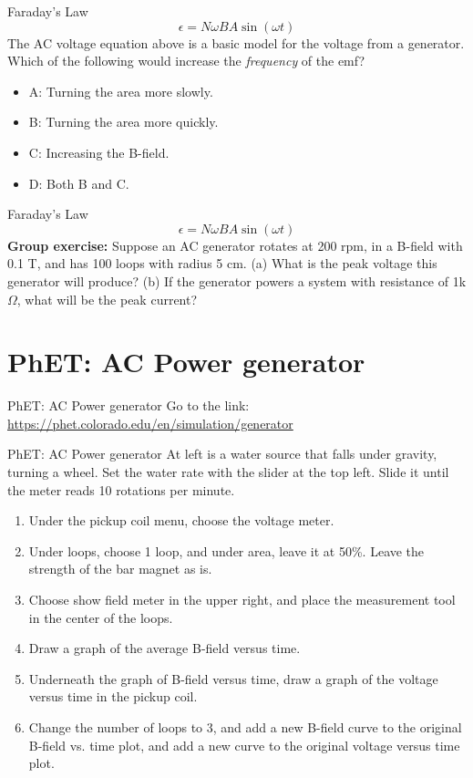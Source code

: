 \documentclass{beamer}
\begin{document}
\begin{frame}{Faraday's Law}
\begin{equation}
\epsilon = N\omega BA \sin(\omega t)
\end{equation}
The AC voltage equation above is a basic model for the voltage from a generator.  Which of the following would increase the \textit{frequency} of the emf?
\begin{itemize}
\item A: Turning the area more slowly.
\item B: Turning the area more quickly.
\item C: Increasing the B-field.
\item D: Both B and C.
\end{itemize}
\end{frame}

\begin{frame}{Faraday's Law}
\begin{equation}
\epsilon = N\omega BA \sin(\omega t)
\end{equation}
\textbf{Group exercise:} Suppose an AC generator rotates at 200 rpm, in a B-field with 0.1 T, and has 100 loops with radius 5 cm.  (a) What is the peak voltage this generator will produce? (b) If the generator powers a system with resistance of 1k$\Omega$, what will be the peak current?
\end{frame}

\section{PhET: AC Power generator}

\begin{frame}{PhET: AC Power generator}
\small
Go to the link: \\ \vspace{0.5cm}
\url{https://phet.colorado.edu/en/simulation/generator}
\end{frame}

\begin{frame}{PhET: AC Power generator}
\small
At left is a water source that falls under gravity, turning a wheel.  Set the water rate with the slider at the top left.  Slide it until the meter reads 10 rotations per minute.
\begin{enumerate}
\item Under the pickup coil menu, choose the voltage meter.
\item Under loops, choose 1 loop, and under area, leave it at 50\%.  Leave the strength of the bar magnet as is.
\item Choose show field meter in the upper right, and place the measurement tool in the center of the loops.
\item Draw a graph of the average B-field versus time.
\item Underneath the graph of B-field versus time, draw a graph of the voltage versus time in the pickup coil.
\item Change the number of loops to 3, and add a new B-field curve to the original B-field vs. time plot, and add a new curve to the original voltage versus time plot.
\end{enumerate}
\end{frame}
\end{document}
